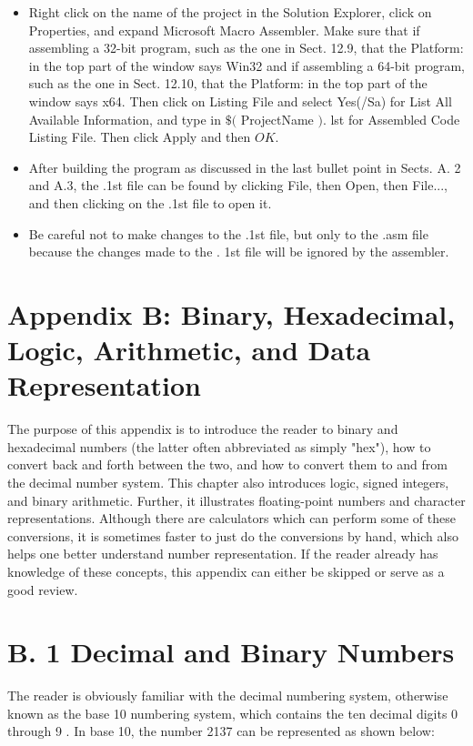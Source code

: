 \documentclass[10pt]{article}
\begin{document}
\begin{itemize}
  \item Right click on the name of the project in the Solution Explorer, click on Properties, and expand Microsoft Macro Assembler. Make sure that if assembling a 32-bit program, such as the one in Sect. 12.9, that the Platform: in the top part of the window says Win32 and if assembling a 64-bit program, such as the one in Sect. 12.10, that the Platform: in the top part of the window says x64. Then click on Listing File and select Yes(/Sa) for List All Available Information, and type in $\$($ ProjectName $)$. lst for Assembled Code Listing File. Then click Apply and then $O K$.
  \item After building the program as discussed in the last bullet point in Sects. A. 2 and A.3, the .1st file can be found by clicking File, then Open, then File..., and then clicking on the .1st file to open it.
  \item Be careful not to make changes to the .1st file, but only to the .asm file because the changes made to the . 1st file will be ignored by the assembler.
\end{itemize}

\section*{Appendix B: Binary, Hexadecimal, Logic, Arithmetic, and Data Representation}
The purpose of this appendix is to introduce the reader to binary and hexadecimal numbers (the latter often abbreviated as simply "hex"), how to convert back and forth between the two, and how to convert them to and from the decimal number system. This chapter also introduces logic, signed integers, and binary arithmetic. Further, it illustrates floating-point numbers and character representations. Although there are calculators which can perform some of these conversions, it is sometimes faster to just do the conversions by hand, which also helps one better understand number representation. If the reader already has knowledge of these concepts, this appendix can either be skipped or serve as a good review.

\section*{B. 1 Decimal and Binary Numbers}
The reader is obviously familiar with the decimal numbering system, otherwise known as the base 10 numbering system, which contains the ten decimal digits 0 through 9 . In base 10, the number 2137 can be represented as shown below:
\end{document}
